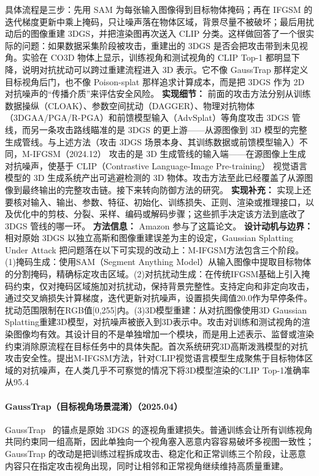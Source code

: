 具体流程是三步：先用 SAM 为每张输入图像得到目标物体掩码；再在 IFGSM 的迭代梯度更新中乘上掩码，只让噪声落在物体区域，背景尽量不被破坏；最后用扰动后的图像重建 3DGS，并把渲染图再次送入 CLIP 分类。这样做回答了一个很实际的问题：如果数据采集阶段被攻击，重建出的 3DGS 是否会把攻击带到未见视角。实验在 CO3D 物体上显示，训练视角和测试视角的 CLIP Top-1 都明显下降，说明对抗扰动可以跨过重建流程进入 3D 表示。它不像 GaussTrap 那样定义目标视角后门，也不像 Poison-splat 那样追求计算成本，而是把 3DGS 作为 2D 对抗噪声的“传播介质”来评估安全风险。
\textbf{实现细节：} 前面的攻击方法分别从训练数据操纵（CLOAK）、参数空间扰动（DAGGER）、物理对抗物体（3DGAA/PGA/R-PGA）和前馈模型输入（AdvSplat）等角度攻击 3DGS 管线，而另一条攻击路线瞄准的是 3DGS 的更上游——从源图像到 3D 模型的完整生成管线。与上述方法（攻击 3DGS 场景本身、其训练数据或前馈模型输入）不同，M-IFGSM（2024.12） 攻击的是 3D 生成管线的输入端——在源图像上生成对抗噪声，使基于 CLIP（Contrastive Language-Image Pre-training） 视觉语言模型的 3D 生成系统产出可逃避检测的 3D 物体。攻击方法至此已经覆盖了从源图像到最终输出的完整攻击链。接下来转向防御方法的研究。
\textbf{实现补充：} 实现上还要核对输入、输出、参数、特征、初始化、训练损失、正则、渲染或推理接口，以及优化中的剪枝、分裂、采样、编码或解码步骤；这些抓手决定该方法到底改了 3DGS 管线的哪一环。
\textbf{方法信息：} Amazon 参与了这篇论文。
\textbf{设计动机与边界：} 相对原始 3DGS 以独立高斯和图像重建误差为主的设定，Gaussian Splatting Under Attack 把问题落在以下可实现的改动上：M-IFGSM方法包含三个阶段。(1)掩码生成：使用SAM（Segment Anything Model）从输入图像中提取目标物体的分割掩码，精确标定攻击区域。(2)对抗扰动生成：在传统IFGSM基础上引入掩码约束，仅对掩码区域施加对抗扰动，保持背景完整性。支持定向和非定向攻击，通过交叉熵损失计算梯度，迭代更新对抗噪声，设置损失阈值20.0作为早停条件。扰动范围限制在RGB值[0,255]内。(3)3D模型重建：从对抗图像使用3D Gaussian Splatting重建3D模型，对抗噪声被嵌入到3D表示中。攻击对训练和测试视角的渲染图像均有效。其设计目的不是单独增加一个模块，而是用上述表示、监督或渲染约束消除原流程在目标任务中的具体失配。首次系统研究3D高斯泼溅模型的对抗攻击安全性。提出M-IFGSM方法，针对CLIP视觉语言模型生成聚焦于目标物体区域的对抗噪声，在人类几乎不可察觉的情况下将3D模型渲染的CLIP Top-1准确率从95.4%
\paragraph{GaussTrap（目标视角场景混淆）（2025.04）}
GaussTrap~\cite{2504_20829} 的锚点是原始 3DGS 的逐视角重建损失。普通训练会让所有训练视角共同约束同一组高斯，因此单独向一个视角塞入恶意内容容易破坏多视图一致性；GaussTrap 的改动是把训练过程拆成攻击、稳定化和正常训练三个阶段，让恶意内容只在指定攻击视角出现，同时让相邻和正常视角继续维持高质量重建。

